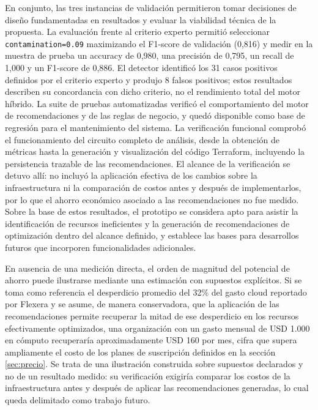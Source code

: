 En conjunto, las tres instancias de validación permitieron tomar decisiones de diseño fundamentadas en resultados y evaluar la viabilidad técnica de la propuesta. La evaluación frente al criterio experto permitió seleccionar \texttt{contamination=0.09} maximizando el F1-score de validación (0,816) y medir en la muestra de prueba un accuracy de 0,980, una precisión de 0,795, un recall de 1,000 y un F1-score de 0,886. El detector identificó los 31 casos positivos definidos por el criterio experto y produjo 8 falsos positivos; estos resultados describen su concordancia con dicho criterio, no el rendimiento total del motor híbrido. La suite de pruebas automatizadas verificó el comportamiento del motor de recomendaciones y de las reglas de negocio, y quedó disponible como base de regresión para el mantenimiento del sistema. La verificación funcional comprobó el funcionamiento del circuito completo de análisis, desde la obtención de métricas hasta la generación y visualización del código Terraform, incluyendo la persistencia trazable de las recomendaciones. El alcance de la verificación se detuvo allí: no incluyó la aplicación efectiva de los cambios sobre la infraestructura ni la comparación de costos antes y después de implementarlos, por lo que el ahorro económico asociado a las recomendaciones no fue medido. Sobre la base de estos resultados, el prototipo se considera apto para asistir la identificación de recursos ineficientes y la generación de recomendaciones de optimización dentro del alcance definido, y establece las bases para desarrollos futuros que incorporen funcionalidades adicionales.

En ausencia de una medición directa, el orden de magnitud del potencial de ahorro puede ilustrarse mediante una estimación con supuestos explícitos. Si se toma como referencia el desperdicio promedio del 32\% del gasto cloud reportado por Flexera \parencite{Flexera2023} y se asume, de manera conservadora, que la aplicación de las recomendaciones permite recuperar la mitad de ese desperdicio en los recursos efectivamente optimizados, una organización con un gasto mensual de USD 1.000 en cómputo recuperaría aproximadamente USD 160 por mes, cifra que supera ampliamente el costo de los planes de suscripción definidos en la sección \ref{sec:precio}. Se trata de una ilustración construida sobre supuestos declarados y no de un resultado medido: su verificación exigiría comparar los costos de la infraestructura antes y después de aplicar las recomendaciones generadas, lo cual queda delimitado como trabajo futuro.
